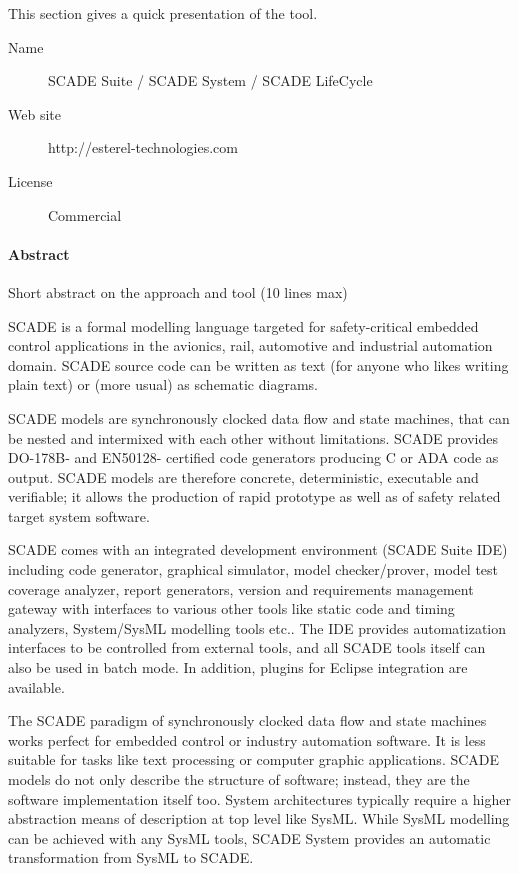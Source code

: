 This section gives a quick presentation of the tool.

\begin{description}
\item[Name] SCADE Suite / SCADE System / SCADE LifeCycle
\item[Web site] http://esterel-technologies.com 
\item[License] Commercial
\end{description}

\paragraph{Abstract} Short abstract on the approach and tool (10 lines max)

SCADE is a formal modelling language targeted for safety-critical embedded control applications
in the avionics, rail, automotive and industrial automation domain. SCADE source code can be
written as text (for anyone who likes writing plain text) or (more usual) as schematic diagrams.

SCADE models are synchronously clocked data flow and state machines, that can be nested
and intermixed with each other without limitations. SCADE provides DO-178B- and EN50128-
certified code generators producing C or ADA code as output. SCADE models are therefore concrete, deterministic, executable and verifiable; it allows the production of rapid prototype as
well as of safety related target system software.

SCADE comes with an integrated development environment (SCADE Suite IDE) including
code generator, graphical simulator, model checker/prover, model test coverage analyzer, report
generators, version and requirements management gateway with interfaces to various other tools
like static code and timing analyzers, System/SysML modelling tools etc.. The IDE provides
automatization interfaces to be controlled from external tools, and all SCADE tools itself can
also be used in batch mode. In addition, plugins for Eclipse integration are available.

The SCADE paradigm of synchronously clocked data flow and state machines works perfect for
embedded control or industry automation software. It is less suitable for tasks like text processing
or computer graphic applications. SCADE models do not only describe the structure of software;
instead, they are the software implementation itself too. System architectures typically require a
higher abstraction means of description at top level like SysML. While SysML modelling can
be achieved with any SysML tools, SCADE System provides an automatic transformation from
SysML to SCADE.


